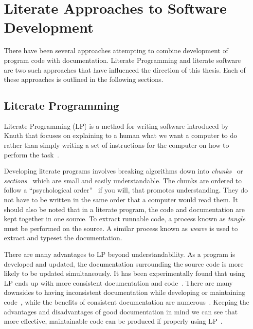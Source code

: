 \section{Literate Approaches to Software Development}

There have been several approaches attempting to combine development of program 
code with documentation. Literate Programming and literate software are two 
such approaches that have influenced the direction of this thesis. Each of 
these approaches is outlined in the following sections.

\subsection{Literate Programming}

Literate Programming (LP) is a method for writing software introduced by Knuth 
that focuses on explaining to a human what we want a computer to do rather than 
simply writing a set of instructions for the computer on how to perform the 
task~\cite{Knuth1984}.

Developing literate programs involves breaking algorithms down into
\emph{chunks}~\cite{JohnsonAndJohnson1997} or \emph{sections}~\cite{Knuth1984}
which are small and easily understandable. The chunks are ordered to follow a 
``psychological order''~\cite{PieterseKourieAndBoake2004} if
you will, that promotes understanding. They do not have to be written in the 
same order that a computer would read them. It should also be noted that in a 
literate program, the code and documentation are kept together in one source. 
To extract runnable code, a process known as \emph{tangle} must be performed on 
the source. A similar process known as \emph{weave} is used to extract and 
typeset the documentation.

There are many advantages to LP beyond understandability. As a program is
developed and updated, the documentation surrounding the source code is more 
likely to be updated simultaneously. It has been experimentally found that 
using LP ends up with more consistent documentation and 
code~\cite{ShumAndCook1993}. There are many downsides to having inconsistent 
documentation while developing or maintaining 
code~\cite{Kotula2000,Thimbleby1986}, while the benefits of consistent 
documentation are numerous~\cite{Hyman1990, Kotula2000}. Keeping the advantages 
and disadvantages of good documentation in mind we can see that more effective, 
maintainable code can be produced if properly using 
LP~\cite{PieterseKourieAndBoake2004}.

